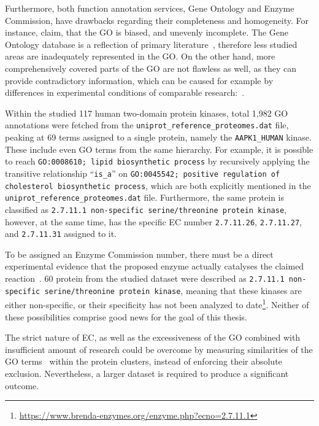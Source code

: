 Furthermore, both function annotation services, Gene Ontology and Enzyme Commission, have
drawbacks regarding their completeness and homogeneity.
For instance, \citet{gaudet2017gene} claim, that the GO is biased, and unevenly
incomplete.
The Gene Ontology database is a reflection of primary literature~\cite{gene2004gene},
therefore less studied areas are inadequately represented in the GO.
On the other hand, more comprehensively covered parts of the GO are not flawless as well,
as they can provide contradictory information, which can be caused for example by
differences in experimental conditions of comparable
research:~\cite{hass2004response, mason2005multiple}.

Within the studied 117 human two-domain protein kinases, total 1,982 GO annotations were
fetched from the \texttt{uniprot\_reference\_proteomes.dat} file, peaking at 69 terms
assigned to a single protein, namely the \texttt{AAPK1\_HUMAN} kinase.
These include even GO terms from the same hierarchy.
For example, it is possible to reach \texttt{GO:0008610; lipid biosynthetic process} by
recursively applying the transitive relationship ``\texttt{is\_a}'' on
\texttt{GO:0045542; positive regulation of cholesterol biosynthetic process}, which are
both explicitly mentioned in the \texttt{uniprot\_reference\_proteomes.dat} file.
Furthermore, the same protein is classified as \texttt{2.7.11.1 non-specific
serine/threonine protein kinase}, however, at the same time, has the specific EC number
\texttt{2.7.11.26}, \texttt{2.7.11.27}, and \texttt{2.7.11.31} assigned to it.

To be assigned an Enzyme Commission number, there must be a direct experimental evidence
that the proposed enzyme actually catalyses the claimed reaction~\cite{mcdonald2014fifty}.
60 protein from the studied dataset were described as \texttt{2.7.11.1 non-specific
serine/threonine protein kinase}, meaning that these kinases are either non-specific,
or their specificity has not been analyzed to
date\footnote{\url{https://www.brenda-enzymes.org/enzyme.php?ecno=2.7.11.1}}.
Neither of these possibilities comprise good news for the goal of this thesis.

The strict nature of EC, as well as the excessiveness of the GO combined with insufficient
amount of research could be overcome by measuring similarities of the GO
terms~\cite{li2010effectively, zhao2018gogo} within the protein clusters, instead of
enforcing their absolute exclusion.
Nevertheless, a larger dataset is required to produce a significant outcome.
